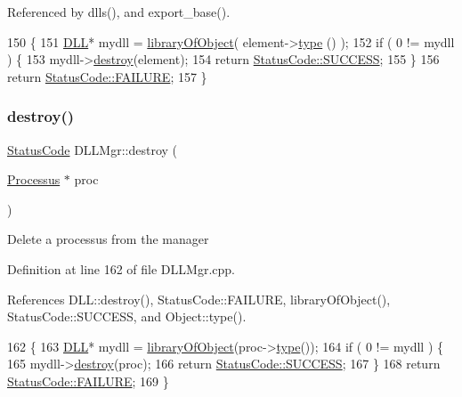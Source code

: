 Referenced by dlls(), and export\+\_\+base().


\begin{DoxyCode}
150                                               \{
151   \hyperlink{classDLL}{DLL}* mydll = \hyperlink{classDLLMgr_a7e8c992899b7357158aef047a2f15c51}{libraryOfObject}( element->\hyperlink{classObject_a84f99f70f144a83e1582d1d0f84e4e62}{type} () );
152   \textcolor{keywordflow}{if} ( 0 != mydll ) \{
153     mydll->\hyperlink{classDLL_abbe40e8f9065dfcfef3df9decb60087b}{destroy}(element);
154     \textcolor{keywordflow}{return} \hyperlink{classStatusCode_a6f565cbeadc76d14c72f047e5e85eb4badd0da38d3ba0d922efd1f4619bc37ad8}{StatusCode::SUCCESS};
155   \}
156   \textcolor{keywordflow}{return} \hyperlink{classStatusCode_a6f565cbeadc76d14c72f047e5e85eb4ba3da73d4c469762eb9d3c960368252b26}{StatusCode::FAILURE};
157 \}
\end{DoxyCode}
\mbox{\label{classDLLMgr_a8f0923cc39c9f73d272f38bcbcf7ca18}} 
\subsubsection{\texorpdfstring{destroy()}{destroy()}\hspace{0.1cm}{\footnotesize\ttfamily [2/2]}}
{\footnotesize\ttfamily \hyperlink{classStatusCode}{Status\+Code} D\+L\+L\+Mgr\+::destroy (\begin{DoxyParamCaption}\item[{\hyperlink{classProcessus}{Processus} $\ast$}]{proc }\end{DoxyParamCaption})}

Delete a processus from the manager 

Definition at line 162 of file D\+L\+L\+Mgr.\+cpp.



References D\+L\+L\+::destroy(), Status\+Code\+::\+F\+A\+I\+L\+U\+RE, library\+Of\+Object(), Status\+Code\+::\+S\+U\+C\+C\+E\+SS, and Object\+::type().


\begin{DoxyCode}
162                                              \{
163   \hyperlink{classDLL}{DLL}* mydll = \hyperlink{classDLLMgr_a7e8c992899b7357158aef047a2f15c51}{libraryOfObject}(proc->\hyperlink{classObject_a84f99f70f144a83e1582d1d0f84e4e62}{type}());
164   \textcolor{keywordflow}{if} ( 0 != mydll ) \{
165     mydll->\hyperlink{classDLL_abbe40e8f9065dfcfef3df9decb60087b}{destroy}(proc);
166     \textcolor{keywordflow}{return} \hyperlink{classStatusCode_a6f565cbeadc76d14c72f047e5e85eb4badd0da38d3ba0d922efd1f4619bc37ad8}{StatusCode::SUCCESS};
167   \}
168   \textcolor{keywordflow}{return} \hyperlink{classStatusCode_a6f565cbeadc76d14c72f047e5e85eb4ba3da73d4c469762eb9d3c960368252b26}{StatusCode::FAILURE};
169 \}
\end{DoxyCode}
\mbox{\label{classDLLMgr_a0241372eb2e136f61e609a04426636bd}} 
